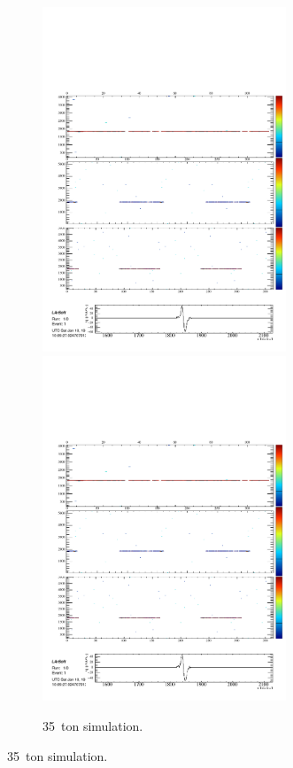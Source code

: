\begin{figure}
\begin{subfigure}[t]{\linewidth}
\begin{minipage}{0.48\textwidth}
      \includegraphics[width=0.8\textwidth]{SimulatedMuonU1.pdf}
      \includegraphics[width=0.8\textwidth]{SimulatedMuonU2.pdf}
    \end{minipage}
    \caption{35~ton simulation.}
    \label{fig:SimulationMuon}
  \end{subfigure}


\end{figure}
